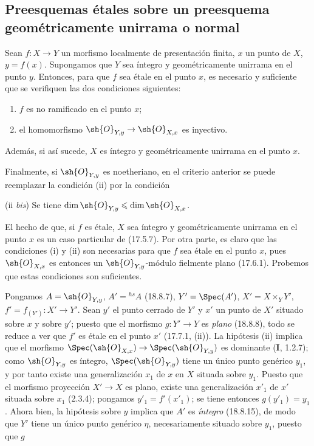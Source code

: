 \subsection{Preesquemas étales sobre un preesquema geométricamente unirrama o normal}
\label{subsection:IV.18.10}

\begin{theorem}[18.10.1]
\label{IV.18.10.1}
Sean $f:X\to Y$ un morfismo localmente de presentación finita, $x$ un punto de $X$, $y=f(x)$. Supongamos que $Y$ sea íntegro y geométricamente unirrama en el punto $y$. Entonces, para que $f$ sea étale en el punto $x$, es necesario y suficiente que se verifiquen las dos condiciones siguientes:
\begin{enumerate}
  \item[\textup{(i)}] $f$ es no ramificado en el punto $x$;
  \item[\textup{(ii)}] el homomorfismo $\sh{O}_{Y,y}\to\sh{O}_{X,x}$ es inyectivo.
\end{enumerate}
Además, si así sucede, $X$ es íntegro y geométricamente unirrama en el punto $x$.

Finalmente, si $\sh{O}_{Y,y}$ es noetheriano, en el criterio anterior se puede reemplazar la condición \textup{(ii)} por la condición

\textup{(ii \emph{bis})} Se tiene $\dim\sh{O}_{Y,y}\leq\dim\sh{O}_{X,x}$.
\end{theorem}

El hecho de que, si $f$ es étale, $X$ sea íntegro y geométricamente unirrama en el punto $x$ es un caso particular de (17.5.7). Por otra parte, es claro que las condiciones (i) y (ii) son necesarias para que $f$ sea étale en el punto $x$, pues $\sh{O}_{X,x}$ es entonces un $\sh{O}_{Y,y}$-módulo fielmente plano (17.6.1). Probemos que estas condiciones son suficientes.

Pongamos $A=\sh{O}_{Y,y}$, $A'={}^{hs}\!A$ (18.8.7), $Y'=\Spec(A')$, $X'=X\times_Y Y'$, $f'=f_{(Y')}:X'\to Y'$. Sean $y'$ el punto cerrado de $Y'$ y $x'$ un punto de $X'$ situado sobre $x$ y sobre $y'$; puesto que el morfismo $g:Y'\to Y$ es \emph{plano} (18.8.8), todo se reduce a ver que $f'$ es étale en el punto $x'$ (17.7.1, (ii)). La hipótesis (ii) implica que el morfismo $\Spec(\sh{O}_{X,x})\to\Spec(\sh{O}_{Y,y})$ es dominante (\textbf I, 1.2.7); como $\sh{O}_{Y,y}$ es íntegro, $\Spec(\sh{O}_{Y,y})$ tiene un único punto genérico $y_1$, y por tanto existe una generalización $x_1$ de $x$ en $X$ situada sobre $y_1$. Puesto que el morfismo proyección $X'\to X$ es plano, existe una generalización $x'_1$ de $x'$ situada sobre $x_1$ (2.3.4); pongamos $y'_1=f'(x'_1)$; se tiene entonces $g(y'_1)=y_1$. Ahora bien, la hipótesis sobre $y$ implica que $A'$ es \emph{íntegro} (18.8.15), de modo que $Y'$ tiene un único punto genérico $\eta$, necesariamente situado sobre $y_1$, puesto que $g$

